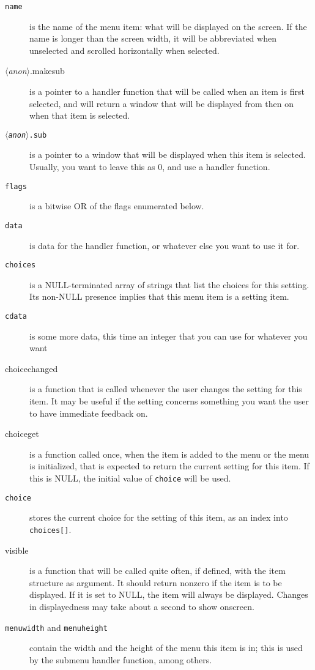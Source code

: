 \documentclass[12pt,letterpaper]{report}
\let\ttt\tt
\def\tt{\def\_{{\ttt\char`\_}}\ttt}
\def\<#1>{\leavevmode\hbox{$\langle${\sl#1\/}$\rangle$}}
\begin{document}
\begin{description}
\item[{\tt name}] is the name of the menu item: what will be displayed on the screen. If the name is
longer than the screen width, it will be abbreviated when unselected and scrolled horizontally when selected.
\item[{\sf \<anon>.makesub}] is a pointer to a handler function that will be called when an item is first selected,
and will return a window that will be displayed from then on when that item is selected.
\item[{\tt \<anon>.sub}] is a pointer to a window that will be displayed when this item is selected. Usually,
you want to leave this as 0, and use a handler function.
\item[{\tt flags}] is a bitwise OR of the flags enumerated below.
\item[{\tt data}] is data for the handler function, or whatever else you want to use it for.
\item[{\tt choices}] is a NULL-terminated array of strings that list the choices for this setting.
Its non-NULL presence implies that this menu item is a setting item.
\item[{\tt cdata}] is some more data, this time an integer that you can use for whatever you want
\item[{\sf choicechanged}] is a function that is called whenever the user changes the setting for this item.
It may be useful if the setting concerns something you want the user to have immediate feedback on.
\item[{\sf choiceget}] is a function called once, when the item is added to the menu or the menu is
initialized, that is expected to return the current setting for this item. If this is NULL, the initial value
of {\tt choice} will be used.
\item[{\tt choice}] stores the current choice for the setting of this item, as an index into {\tt choices[]}.
\item[{\sf visible}] is a function that will be called quite often, if defined, with the item structure
as argument. It should return nonzero if the item is to be displayed. If it is set to NULL, the item
will always be displayed. Changes in displayedness may take about a second to show onscreen.
\item[{\tt menuwidth} and {\tt menuheight}] contain the width and the height of the menu this item is in;
this is used by the submenu handler function, among others.
\end{description}
\end{document}
